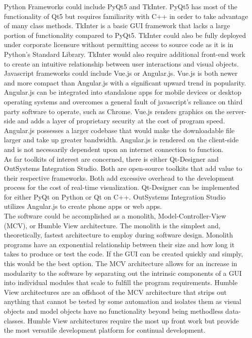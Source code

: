 \documentclass[12pt]{article}
\begin{document}
\indent
Python Frameworks could include PyQt5 and TkInter.  PyQt5 has most of the functionality of Qt5 but requires familiarity with C++ in order to take advantage of many class methods.  TkInter is a basic GUI framework that lacks a large portion of functionality compared to PyQt5.  TkInter could also be fully deployed under corporate licensure without permitting access to source code as it is in Python’s Standard Library.  TkInter would also require additional front-end work to create an intuitive relationship between user interactions and visual objects.\\

\indent
Javascript frameworks could include Vue.js or Angular.js.  Vue.js is both newer and more compact than Angular.js with a significant upward trend in popularity.  Angular.js can be integrated into standalone apps for mobile devices or desktop operating systems and overcomes a general fault of javascript’s reliance on third party software to operate, such as Chrome.  Vue.js renders graphics on the server-side and adds a layer of proprietary security at the cost of program speed.  Angular.js possesses a larger codebase that would make the downloadable file larger and take up greater bandwidth.  Angular.js is rendered on the client-side and is not necessarily dependent upon an internet connection to function.\\

\indent
As far toolkits of interest are concerned, there is either Qt-Designer and OutSystems Integration Studio.  Both are open-source toolkits that add value to their respective frameworks.  Both add excessive overhead to the development process for the cost of real-time visualization.  Qt-Designer can be implemented for either PyQt on Python or Qt on C++.  OutSystems Integration Studio utilizes Angular.js to create phone apps or web apps.\\

\indent
The software could be accomplished as a monolith, Model-Controller-View (MCV), or Humble View architecture.  The monolith is the simplest and, theoretically, fastest architecture to employ during software design.  Monolith programs have an exponential relationship between their size and how long it takes to produce or test the code.  If the GUI can be created quickly and simply, this would be the best option.  The MCV architecture allows for an increase in modularity to the software by separating out the intrinsic components of a GUI into individual modules that scale to fulfill the program requirements.  Humble View architectures are an offshoot of the MCV architecture that strips out anything that cannot be tested by some automation and isolates them as visual objects and model objects have no functionality beyond being methodless data-classes.  Humble View architectures require the most up front work but provide the most versatile development platform for continual development.\\
\end{document}
